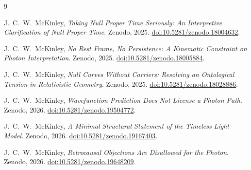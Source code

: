 \documentclass[12pt,onecolumn]{article}
\begin{document}
\begin{thebibliography}{9}

J.~C.~W.~McKinley,
\textit{Taking Null Proper Time Seriously: An Interpretive Clarification of Null Proper Time}.
Zenodo, 2025.
\href{https://doi.org/10.5281/zenodo.18004632}
{doi:10.5281/zenodo.18004632}.

J.~C.~W.~McKinley,
\textit{No Rest Frame, No Persistence: A Kinematic Constraint on Photon Interpretation}.
Zenodo, 2025.
\href{https://doi.org/10.5281/zenodo.18005884}
{doi:10.5281/zenodo.18005884}.

J.~C.~W.~McKinley,
\textit{Null Curves Without Carriers: Resolving an Ontological Tension in Relativistic Geometry}.
Zenodo, 2025.
\href{https://doi.org/10.5281/zenodo.18028886}
{doi:10.5281/zenodo.18028886}.

J.~C.~W.~McKinley,
\textit{Wavefunction Prediction Does Not License a Photon Path}.
Zenodo, 2026.
\href{https://doi.org/10.5281/zenodo.19504772}
{doi:10.5281/zenodo.19504772}.

J.~C.~W.~McKinley,
\textit{A Minimal Structural Statement of the Timeless Light Model}.
Zenodo, 2026.
\href{https://doi.org/10.5281/zenodo.19167403}
{doi:10.5281/zenodo.19167403}.

J.~C.~W.~McKinley,
\textit{Retrocausal Objections Are Disallowed for the Photon}.
Zenodo, 2026.
\href{https://doi.org/10.5281/zenodo.19648209}
{doi:10.5281/zenodo.19648209}.

\end{thebibliography}
\end{document}
